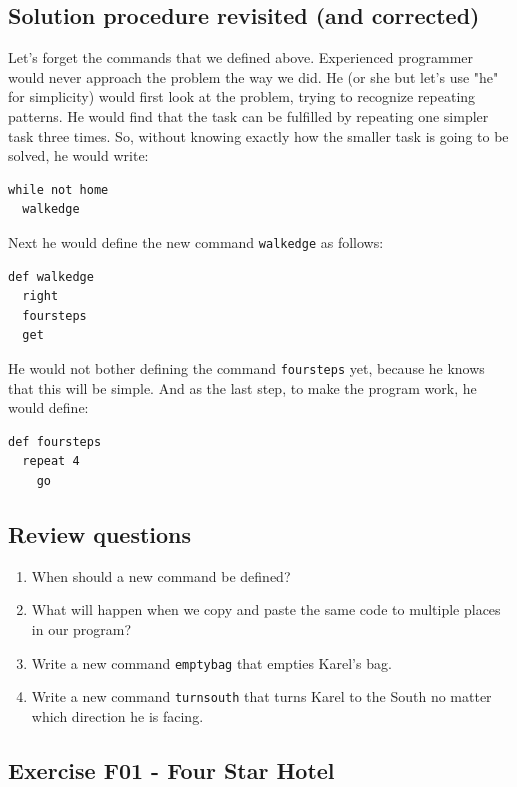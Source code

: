 \documentclass[article,A4,12pt]{llncs}
\begin{document}
{{{{\subsection{Solution procedure revisited (and corrected)}

Let's forget the commands that we defined above.
Experienced programmer would never approach the problem the way we did.
He (or she but let's use "he" for simplicity) 
would first look at the problem, trying to recognize repeating patterns. 
He would find that the task can be fulfilled by repeating one simpler task 
three times. So, without knowing exactly how the smaller task is going to 
be solved, he would write:

{\small
\begin{verbatim}
while not home
  walkedge
\end{verbatim}
}
\noindent
Next he would define the new command {\tt walkedge} as follows:

{\small
\begin{verbatim}
def walkedge
  right
  foursteps
  get
\end{verbatim}
}
\noindent
He would not bother defining the command 
{\tt foursteps} yet, because he knows that this will be 
simple. And as the last step, to make the program work, he would 
define:

{\small
\begin{verbatim}
def foursteps
  repeat 4
    go
\end{verbatim}
}

\subsection{Review questions}

\begin{enumerate}
\item When should a new command be defined?
\item What will happen when we copy and paste the same code 
      to multiple places in our program?
\item Write a new command {\tt emptybag} that empties Karel's bag.
\item Write a new command {\tt turnsouth} that turns Karel to the South no matter 
      which direction he is facing.
\end{enumerate}


\subsection{Exercise F01 - Four Star Hotel}

}}}}
\end{document}
